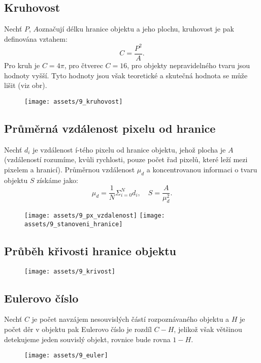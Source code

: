 \subsection{Kruhovost}
Nechť $ P $, $ A  $označují délku hranice objektu a jeho plochu, kruhovost je pak definována vztahem:
\begin{equation*}
    C = \frac{P^2}{A}.
\end{equation*}
Pro kruh je $C = 4 \pi$, pro čtverec $C = 16$, pro objekty nepravidelného tvaru jsou hodnoty vyšší. Tyto hodnoty jsou však teoretické a skutečná hodnota se může lišit (viz obr).
\begin{figure}[H]
    \centering
    \texttt{[image: assets/9\_kruhovost]}
\end{figure}

\subsection{Průměrná vzdálenost pixelu od hranice}
Nechť $d_i$ je vzdálenost í-tého pixelu od hranice objektu, jehož plocha je $A$ (vzdáleností rozumíme, kvůli rychlosti, pouze počet řad pixelů, které leží mezi pixelem a hranicí). Průměrnou vzdálenost $\mu_d$ a koncentrovanou informaci o tvaru objektu $S$ získáme jako:
\begin{equation*}
    \mu_d = \frac{1}{N} \Sigma^N_{i = 0}d_i, \quad S = \frac{A}{\mu_d^2}.
\end{equation*}

\begin{figure}[H]
    \centering
    \texttt{[image: assets/9\_px\_vzdalenost]}
    \texttt{[image: assets/9\_stanoveni\_hranice]}
\end{figure}

\subsection{Průběh křivosti hranice objektu}
\begin{figure}[H]
    \centering
    \texttt{[image: assets/9\_krivost]}
\end{figure}

\subsection{Eulerovo číslo}
Nechť $C$ je počet navzájem nesouvislých částí rozpoznávaného objektu a $H$ je počet děr v objektu pak Eulerovo číslo je rozdíl $C - H$, jelikož však většinou detekujeme jeden souvislý objekt, rovnice bude rovna $1 - H$.
\begin{figure}[H]
    \centering
    \texttt{[image: assets/9\_euler]}
\end{figure}

